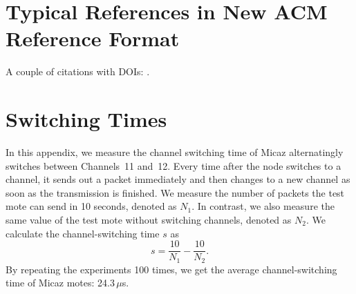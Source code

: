 \documentclass[acmtog, authorversion]{acmart}
\begin{document}
\section{Typical References in New ACM Reference Format}

A couple of citations with DOIs: \cite{2004:ITE:1009386.1010128,
  Kirschmer:2010:AEI:1958016.1958018}.


\appendix
\section{Switching Times}

In this appendix, we measure the channel switching time of Micaz
alternatingly switches between Channels~11 and~12. Every time after
the node switches to a channel, it sends out a packet immediately and
then changes to a new channel as soon as the transmission is finished.
We measure the number of packets the test mote can send in 10 seconds,
denoted as $N_{1}$. In contrast, we also measure the same value of the
test mote without switching channels, denoted as $N_{2}$. We calculate
the channel-switching time $s$ as
\begin{displaymath}%
s=\frac{10}{N_{1}}-\frac{10}{N_{2}}.
\end{displaymath}%
By repeating the experiments 100 times, we get the average
channel-switching time of Micaz motes: 24.3\,$\mu$s.
\end{document}

